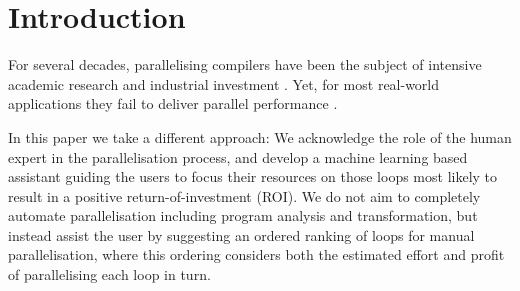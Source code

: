 \documentclass[sigconf,10pt,review,anonymous]{acmart}
\begin{document}
\begin{abstract}

\end{abstract}

%

\maketitle

\section{Introduction}

For several decades, parallelising compilers have been the subject of intensive academic research \cite{XXX} and industrial investment \cite{XXX}. Yet, for most real-world applications they fail to deliver parallel performance \cite{XXX}.


In this paper we take a different approach: We acknowledge the role of the human expert in the parallelisation process, and develop a machine learning based assistant guiding the users to focus their resources on those loops most likely to result in a positive return-of-investment (ROI). We do not aim to completely automate parallelisation including program analysis and transformation, but instead assist the user by suggesting an ordered ranking of loops for manual parallelisation, where this ordering considers both the estimated effort and profit of parallelising each loop in turn.
\end{document}
